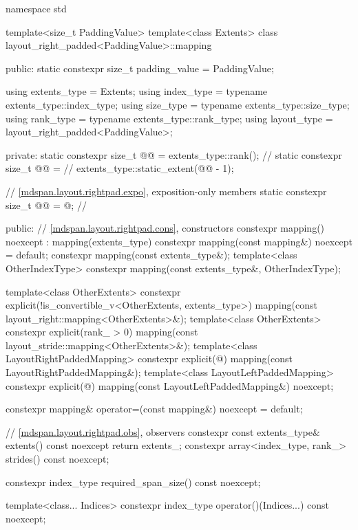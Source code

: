 \begin{codeblock}
namespace std {
  template<size_t PaddingValue>
  template<class Extents>
  class layout_right_padded<PaddingValue>::mapping {
  public:
    static constexpr size_t padding_value = PaddingValue;

    using extents_type = Extents;
    using index_type = typename extents_type::index_type;
    using size_type = typename extents_type::size_type;
    using rank_type = typename extents_type::rank_type;
    using layout_type = layout_right_padded<PaddingValue>;

  private:
    static constexpr size_t @@ = extents_type::rank();    // \expos
    static constexpr size_t @@ =             // \expos
      extents_type::static_extent(@@ - 1);

    // \ref{mdspan.layout.rightpad.expo}, exposition-only members
    static constexpr size_t @@ = @\seebelow@; // \expos

  public:
    // \ref{mdspan.layout.rightpad.cons}, constructors
    constexpr mapping() noexcept : mapping(extents_type{}) {}
    constexpr mapping(const mapping&) noexcept = default;
    constexpr mapping(const extents_type&);
    template<class OtherIndexType>
      constexpr mapping(const extents_type&, OtherIndexType);

    template<class OtherExtents>
      constexpr explicit(!is_convertible_v<OtherExtents, extents_type>)
        mapping(const layout_right::mapping<OtherExtents>&);
    template<class OtherExtents>
      constexpr explicit(rank_ > 0)
        mapping(const layout_stride::mapping<OtherExtents>&);
    template<class LayoutRightPaddedMapping>
      constexpr explicit(@\seebelow@)
        mapping(const LayoutRightPaddedMapping&);
    template<class LayoutLeftPaddedMapping>
      constexpr explicit(@\seebelow@)
        mapping(const LayoutLeftPaddedMapping&) noexcept;

    constexpr mapping& operator=(const mapping&) noexcept = default;

    // \ref{mdspan.layout.rightpad.obs}, observers
    constexpr const extents_type& extents() const noexcept { return extents_; }
    constexpr array<index_type, rank_> strides() const noexcept;

    constexpr index_type required_span_size() const noexcept;

    template<class... Indices>
      constexpr index_type operator()(Indices...) const noexcept;

}}
\end{codeblock}
